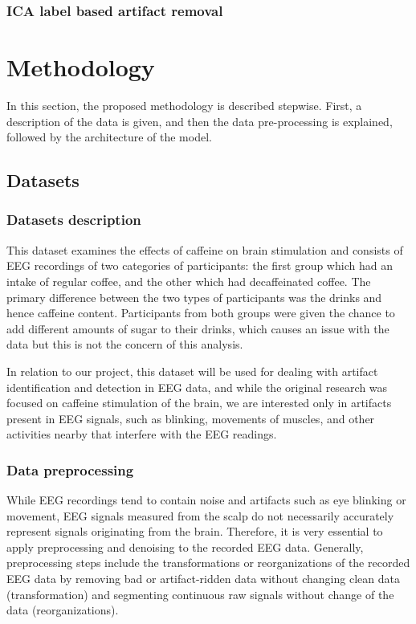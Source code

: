 \documentclass[12pt,a4paper,titlepage,openany]{report}
\begin{document}
\subsection{ICA label based artifact removal}



\chapter{Methodology}
\thispagestyle{fancy}

In this section, the proposed methodology is described stepwise. First, a description of the data is given, and then the data pre-processing is explained, followed by the architecture of the model.

\section{Datasets}

\subsection{Datasets description}

This dataset examines the effects of caffeine on brain stimulation and consists of EEG recordings of two categories of participants: the first group which had an intake of regular coffee, and the other which had decaffeinated coffee. 
The primary difference between the two types of participants was the drinks and hence caffeine content. 
Participants from both groups were given the chance to add different amounts of sugar to their drinks, which causes an issue with the data but this is not the concern of this analysis.

In relation to our project, this dataset will be used for dealing with artifact identification and detection in EEG data, and while the original research was focused on caffeine stimulation of the brain, we are interested only in artifacts present in EEG signals, such as blinking, movements of muscles, and other activities nearby that interfere with the EEG readings.

\subsection{Data preprocessing}

While EEG recordings tend to contain noise and artifacts such as eye blinking or movement, EEG signals measured from the scalp do not necessarily accurately represent signals originating from the brain. 
Therefore, it is very essential to apply preprocessing and denoising to the recorded EEG data. 
Generally, preprocessing steps include the transformations or reorganizations of the recorded EEG data by removing bad or artifact-ridden data without changing clean data (transformation) and segmenting continuous raw signals without change of the data (reorganizations).
\end{document}
